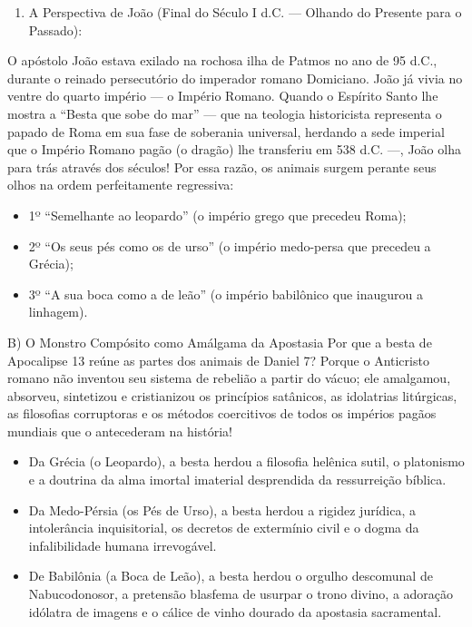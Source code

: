 \documentclass[11pt,a4paper,openany]{book}
\begin{document}
\begin{enumerate}
  \item A Perspectiva de João (Final do Século I d.C. — Olhando do Presente para o Passado):
\end{enumerate}

O apóstolo João estava exilado na rochosa ilha de Patmos no ano de 95 d.C., durante o reinado persecutório do imperador romano Domiciano. João já vivia no ventre do quarto império — o Império Romano. Quando o Espírito Santo lhe mostra a ``Besta que sobe do mar'' — que na teologia historicista representa o papado de Roma em sua fase de soberania universal, herdando a sede imperial que o Império Romano pagão (o dragão) lhe transferiu em 538 d.C. —, João olha para trás através dos séculos!
Por essa razão, os animais surgem perante seus olhos na ordem perfeitamente regressiva:
\begin{itemize}
  \item 1º ``Semelhante ao leopardo'' (o império grego que precedeu Roma);
  \item 2º ``Os seus pés como os de urso'' (o império medo-persa que precedeu a Grécia);
  \item 3º ``A sua boca como a de leão'' (o império babilônico que inaugurou a linhagem).
\end{itemize}


B) O Monstro Compósito como Amálgama da Apostasia
Por que a besta de Apocalipse 13 reúne as partes dos animais de Daniel 7?
Porque o Anticristo romano não inventou seu sistema de rebelião a partir do vácuo; ele amalgamou, absorveu, sintetizou e cristianizou os princípios satânicos, as idolatrias litúrgicas, as filosofias corruptoras e os métodos coercitivos de todos os impérios pagãos mundiais que o antecederam na história!
\begin{itemize}
  \item Da Grécia (o Leopardo), a besta herdou a filosofia helênica sutil, o platonismo e a doutrina da alma imortal imaterial desprendida da ressurreição bíblica.
  \item Da Medo-Pérsia (os Pés de Urso), a besta herdou a rigidez jurídica, a intolerância inquisitorial, os decretos de extermínio civil e o dogma da infalibilidade humana irrevogável.
  \item De Babilônia (a Boca de Leão), a besta herdou o orgulho descomunal de Nabucodonosor, a pretensão blasfema de usurpar o trono divino, a adoração idólatra de imagens e o cálice de vinho dourado da apostasia sacramental.
\end{itemize}
\end{document}
